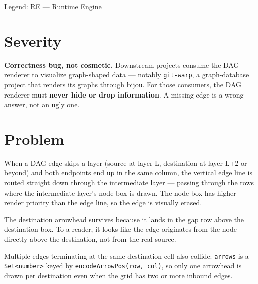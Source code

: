 Legend: \href{https://github.com/flyingrobots/bijou/blob/1853ad902f6bf219326409e7f743a5a1d6517dbc/docs/method/legends/RE-runtime-engine.md}{RE --- Runtime Engine}

\section{Severity}\label{record-289-severity}

\textbf{Correctness bug, not cosmetic.} Downstream projects consume the DAG renderer to visualize graph-shaped data --- notably \texttt{g\allowbreak{}i\allowbreak{}t\allowbreak{}-\allowbreak{}w\allowbreak{}a\allowbreak{}r\allowbreak{}p}, a graph-database project that renders its graphs through bijou. For those consumers, the DAG renderer must \textbf{never hide or drop information}. A missing edge is a wrong answer, not an ugly one.

\section{Problem}\label{record-289-problem}

When a DAG edge skips a layer (source at layer L, destination at layer L+2 or beyond) and both endpoints end up in the same column, the vertical edge line is routed straight down through the intermediate layer --- passing through the rows where the intermediate layer's node box is drawn. The node box has higher render priority than the edge line, so the edge is visually erased.

The destination arrowhead survives because it lands in the gap row above the destination box. To a reader, it looks like the edge originates from the node directly above the destination, not from the real source.

Multiple edges terminating at the same destination cell also collide: \texttt{a\allowbreak{}r\allowbreak{}r\allowbreak{}o\allowbreak{}w\allowbreak{}s} is a \texttt{S\allowbreak{}e\allowbreak{}t\allowbreak{}<\allowbreak{}n\allowbreak{}u\allowbreak{}m\allowbreak{}b\allowbreak{}e\allowbreak{}r\allowbreak{}>} keyed by \texttt{e\allowbreak{}n\allowbreak{}c\allowbreak{}o\allowbreak{}d\allowbreak{}e\allowbreak{}A\allowbreak{}r\allowbreak{}r\allowbreak{}o\allowbreak{}w\allowbreak{}P\allowbreak{}o\allowbreak{}s\allowbreak{}(\allowbreak{}r\allowbreak{}o\allowbreak{}w\allowbreak{},\allowbreak{} \allowbreak{}c\allowbreak{}o\allowbreak{}l\allowbreak{})}, so only one arrowhead is drawn per destination even when the grid has two or more inbound edges.


